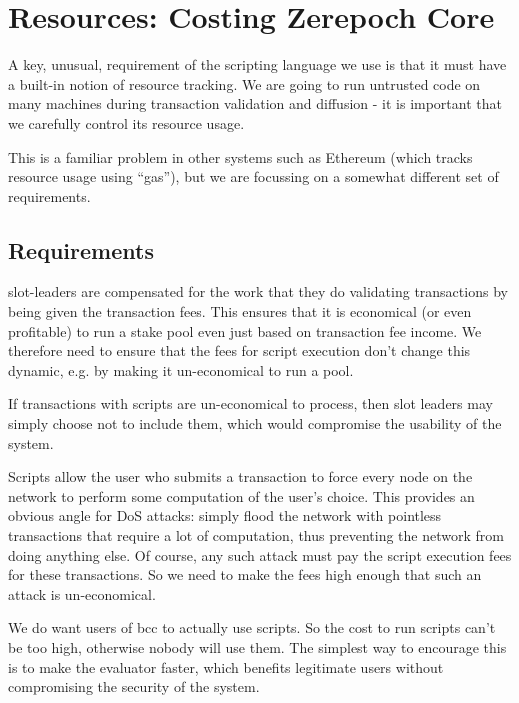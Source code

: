 \section{Resources: Costing Zerepoch Core}
\label{sec:costing}

A key, unusual, requirement of the scripting language we use is that it must have a built-in notion of resource tracking.
We are going to run untrusted code on many machines during transaction validation and diffusion - it is important that we carefully control its resource usage.

This is a familiar problem in other systems such as Ethereum (which tracks resource usage using ``gas''), but we are focussing on a somewhat different set of requirements.

\subsection{Requirements}
\begin{requirement}
\label{req:costing-profitability}
\Glspl{slot-leader} are compensated for the work that they do validating transactions by being given the transaction fees.
This ensures that it is economical (or even profitable) to run a stake pool even just based on transaction fee income.
We therefore need to ensure that the fees for script execution don't change this dynamic, e.g. by making it un-economical to run a pool.

If transactions with scripts are un-economical to process, then slot leaders may simply choose not to include them, which would compromise the usability of the system.
\end{requirement}

\begin{requirement}
\label{req:costing-dos}
Scripts allow the user who submits a transaction to force every node on the network to perform some computation of the user's choice.
This provides an obvious angle for DoS attacks: simply flood the network with pointless transactions that require a lot of computation, thus preventing the network from doing anything else.
Of course, any such attack must pay the script execution fees for these transactions.
So we need to make the fees high enough that such an attack is un-economical.
\end{requirement}

\begin{requirement}
\label{req:costing-usable}
We do want users of \gls{bcc} to actually use scripts.
So the cost to run scripts can't be too high, otherwise nobody will use them.
The simplest way to encourage this is to make the evaluator faster, which benefits legitimate users without compromising the security of the system.
\end{requirement}

